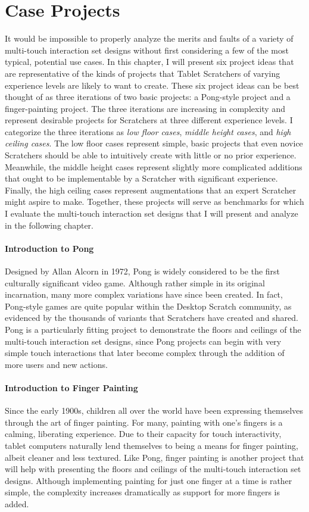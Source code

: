 \chapter{Case Projects}
It would be impossible to properly analyze the merits and faults of a variety of multi-touch interaction set designs without first considering a few of the most typical, potential use cases. In this chapter, I will present six project ideas that are representative of the kinds of projects that Tablet Scratchers of varying experience levels are likely to want to create. These six project ideas can be best thought of as three iterations of two basic projects: a Pong-style project and a finger-painting project. The three iterations are increasing in complexity and represent desirable projects for Scratchers at three different experience levels. I categorize the three iterations as \emph{low floor cases}, \emph{middle height cases}, and \emph{high ceiling cases}. The low floor cases represent simple, basic projects that even novice Scratchers should be able to intuitively create with little or no prior experience. Meanwhile, the middle height cases represent slightly more complicated additions that ought to be implementable by a Scratcher with significant experience. Finally, the high ceiling cases represent augmentations that an expert Scratcher might aspire to make. Together, these projects will serve as benchmarks for which I evaluate the multi-touch interaction set designs that I will present and analyze in the following chapter.

\subsubsection{Introduction to Pong}
Designed by Allan Alcorn in 1972, Pong is widely considered to be the first culturally significant video game. Although rather simple in its original incarnation, many more complex variations have since been created.  In fact, Pong-style games are quite popular within the Desktop Scratch community, as evidenced by the thousands of variants that Scratchers have created and shared. Pong is a particularly fitting project to demonstrate the floors and ceilings of the multi-touch interaction set designs, since Pong projects can begin with very simple touch interactions that later become complex through the addition of more users and new actions.

\subsubsection{Introduction to Finger Painting}
Since the early 1900s, children all over the world have been expressing themselves through the art of finger painting. For many, painting with one's fingers is a calming, liberating experience. Due to their capacity for touch interactivity, tablet computers naturally lend themselves to being a means for finger painting, albeit cleaner and less textured. Like Pong, finger painting is another project that will help with presenting the floors and ceilings of the multi-touch interaction set designs. Although implementing painting for just one finger at a time is rather simple, the complexity increases dramatically as support for more fingers is added.

